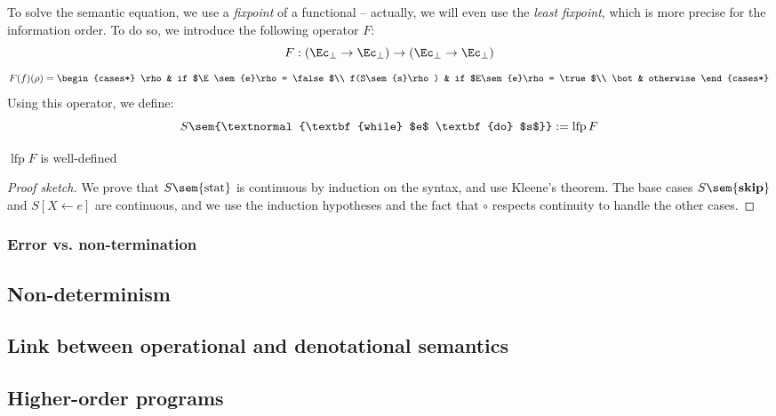 \documentclass[toc]{../cs-classes/cs-classes}
\DeclareMathOperator{\lfp}{lfp}
\begin{document}
To solve the semantic equation, we use a \emph{fixpoint} of a functional -- actually, we will even use the \emph{least fixpoint}, which is more precise for the information order. To do so, we introduce the following operator $F$:
\begin{equation*}
    F : (\Ec_\bot \to \Ec_\bot) \to (\Ec_\bot\to\Ec_\bot)
\end{equation*}
\begin{equation*}
    F(f)(\rho) = \begin{cases*}
        \rho & if $\E\sem{e}\rho = \false$\\
        f(S\sem{s}\rho) & if $E\sem{e}\rho = \true$\\
        \bot & otherwise
    \end{cases*}
\end{equation*}
Using this operator, we define:
\begin{equation*}
    S\sem{\textnormal{\textbf{while} $e$ \textbf{do} $s$}} := \lfp F
\end{equation*}

\begin{theorem}
    $\lfp F$ is well-defined
\end{theorem}
\begin{proof}[Proof sketch]
    We prove that $S\sem{\textnormal{stat}}$ is continuous by induction on the syntax, and use Kleene's theorem. The base cases $S\sem{\textbf{skip}}$ and $S[X\leftarrow e]$ are continuous, and we use the induction hypotheses and the fact that $\circ$ respects continuity to handle the other cases.
\end{proof}

\subsubsection{Error vs. non-termination}

\subsection{Non-determinism}

\subsection{Link between operational and denotational semantics}

\subsection{Higher-order programs}
\end{document}
